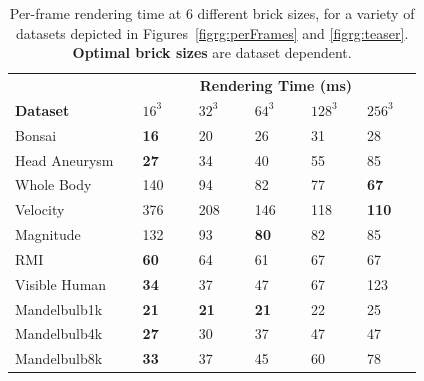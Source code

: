 \begin{table}
  \centering
  \caption{Per-frame rendering time at 6 different brick sizes, for
  a variety of datasets depicted in Figures~\ref{figrg:perFrames} and
  \ref{figrg:teaser}.  \textbf{Optimal brick sizes} are
  dataset dependent.}
  \label{tbl:timings}

  \begin{tabular*}{\linewidth}{|p{0.25825\linewidth}|p{0.11\linewidth}|p{0.11\linewidth}|p{0.11\linewidth}|p{0.11\linewidth}|p{0.11\linewidth}|}\hline
    & \multicolumn{5}{c|}{\textbf{Rendering Time (ms)}}\\
    \cline{2-6}
    \multicolumn{1}{|l|}{\textbf{Dataset}}
                  & $16^3$ & $32^3$ & $64^3$ & $128^3$ & $256^3$ \\\hline
    Bonsai        & {\bf 16} & 20     & 26         & 31  & 28        \\
    Head Aneurysm & {\bf 27} & 34     & 40         & 55  & 85        \\
    Whole Body    & 140      & 94     & 82         & 77  & {\bf 67}  \\
    Velocity      & 376      & 208    & 146        & 118 & {\bf 110} \\
    Magnitude     & 132      & 93     & {\bf 80}   & 82  & 85        \\
    RMI           & {\bf 60} & 64     & 61         & 67  & 67        \\
    Visible Human & {\bf 34} & 37     & 47         & 67  & 123       \\
    Mandelbulb1k  & {\bf 21} & {\bf 21} & {\bf 21} & 22  & 25        \\
    Mandelbulb4k  & {\bf 27} & 30     & 37         & 47  & 47        \\
    Mandelbulb8k  & {\bf 33} & 37     & 45         & 60  & 78        \\\hline
  \end{tabular*}
\end{table}


